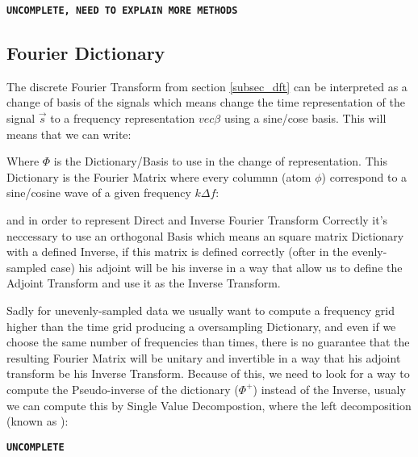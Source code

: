 
\textbf{\texttt{UNCOMPLETE, NEED TO EXPLAIN MORE METHODS}}

\subsection{Fourier Dictionary}

\newp The discrete Fourier Transform from section \ref{subsec_dft} can be interpreted as a change of basis of the signals which means change the time representation of the signal $\vec{s}$ to a frequency representation $vec{\beta}$ using a sine/cose basis. This will means that we can write:


\newp Where $\Phi$ is the Dictionary/Basis to use in the change of representation. This Dictionary is the Fourier Matrix where every colummn (atom $\phi$) correspond to a sine/cosine wave of a given frequency $k\Delta f$:


 \newp and in order to represent Direct and Inverse Fourier Transform Correctly it's neccessary to use an orthogonal Basis which means an square matrix Dictionary with a defined Inverse, if this matrix is defined correctly (ofter in the evenly-sampled case) his adjoint will be his inverse in a way that allow us to define the Adjoint Transform and use it as the Inverse Transform.
 
 
\newp Sadly for unevenly-sampled data we usually want to compute a frequency grid higher than the time grid producing a oversampling Dictionary, and even if we choose the same number of frequencies than times, there is no guarantee that the resulting Fourier Matrix will be unitary and invertible in a way that his adjoint transform be his Inverse Transform. Because of this, we need to look for a way to compute the Pseudo-inverse of the dictionary ($\Phi^{+}$) instead of the Inverse, usualy we can compute this by Single Value Decompostion, where the left decomposition (known as ):

\insertequation[\label{pseudoinverse}]{\Phi^{+}}

\textbf{\texttt{UNCOMPLETE}}  

